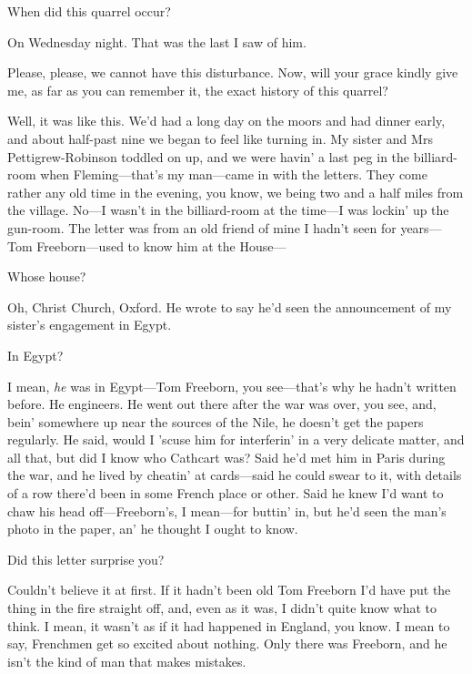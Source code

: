 \begin{dialogue}
 When did this quarrel occur?

 On Wednesday night. That was the last I saw of him. 

 Please, please, we cannot have this disturbance. Now, will your grace kindly give me, as far as you can remember it, the exact history of this quarrel?

 Well, it was like this. We'd had a long day on the moors and had dinner early, and about half-past nine we began to feel like turning in. My sister and Mrs Pettigrew-Robinson toddled on up, and we were havin' a last peg in the billiard-room when Fleming—that's my man—came in with the letters. They come rather any old time in the evening, you know, we being two and a half miles from the village.  No—I wasn't in the billiard-room at the time—I was lockin' up the gun-room. The letter was from an old friend of mine I hadn't seen for years—Tom Freeborn—used to know him at the House—

 Whose house?

 Oh, Christ Church, Oxford. He wrote to say he'd seen the announcement of my sister's engagement in Egypt.

 In Egypt?

 I mean, \textit{he} was in Egypt—Tom Freeborn, you see—that's why he hadn't written before. He engineers. He went out there after the war was over, you see, and, bein' somewhere up near the sources of the Nile, he doesn't get the papers regularly. He said, would I 'scuse him for interferin' in a very delicate matter, and all that, but did I know who Cathcart was? Said he'd met him in Paris during the war, and he lived by cheatin' at cards—said he could swear to it, with details of a row there'd been in some French place or other. Said he knew I'd want to chaw his head off—Freeborn's, I mean—for buttin' in, but he'd seen the man's photo in the paper, an' he thought I ought to know.

 Did this letter surprise you?

 Couldn't believe it at first. If it hadn't been old Tom Freeborn I'd have put the thing in the fire straight off, and, even as it was, I didn't quite know what to think. I mean, it wasn't as if it had happened in England, you know. I mean to say, Frenchmen get so excited about nothing. Only there was Freeborn, and he isn't the kind of man that makes mistakes.


\end{dialogue}
